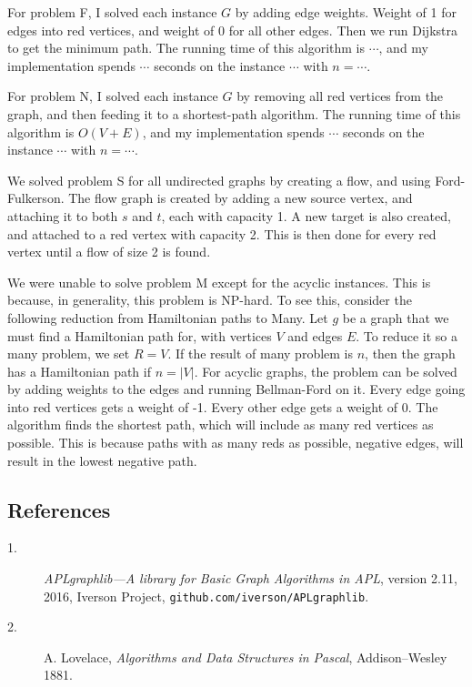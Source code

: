\documentclass{tufte-handout}
\begin{document}
For problem F, I solved each instance $G$ by adding edge weights. Weight of 1 for edges into red vertices, and weight of 0 for all other edges. Then we run Dijkstra to get the minimum path.
The running time of this algorithm is $\cdots$, and my implementation spends $\cdots$ seconds on the instance $\cdots$ with  $n=\cdots$.

For problem N, I solved each instance $G$ by removing all red vertices from the graph, and then feeding it to a shortest-path algorithm.
The running time of this algorithm is $O(V + E)$, and my implementation spends $\cdots$ seconds on the instance $\cdots$ with  $n=\cdots$.

We solved problem S for all undirected graphs by creating a flow, and using Ford-Fulkerson. The flow graph is created by adding a new source vertex, and attaching it to both $s$ and $t$, each with capacity 1. A new target is also created, and attached to a red vertex with capacity 2. This is then done for every red vertex until a flow of size 2 is found.

We were unable to solve problem M except for the acyclic instances.
This is because, in generality, this problem is NP-hard. 
To see this, consider the following reduction from Hamiltonian paths to Many.
Let $g$ be a graph that we must find a Hamiltonian path for, with vertices $V$ and edges $E$. To reduce it so a many problem, we set $R = V$. If the result of many problem is $n$, then the graph has a Hamiltonian path if $n = |V|$.
For acyclic graphs, the problem can be solved by adding weights to the edges and running Bellman-Ford on it. Every edge going into red vertices gets a weight of -1. Every other edge gets a weight of 0. The algorithm finds the shortest path, which will include as many red vertices as possible. This is because paths with as many reds as possible, negative edges, will result in the lowest negative path.


\subsection{References}
\begin{description}
  \item[1.] \emph{APLgraphlib---A library for Basic Graph Algorithms in APL}, version 2.11, 2016, Iverson Project, {\tt github.com/iverson/APLgraphlib}.

  \item[2.] A. Lovelace, \emph{Algorithms and Data Structures in Pascal}, Addison--Wesley 1881. 
\end{description}
\end{document}
